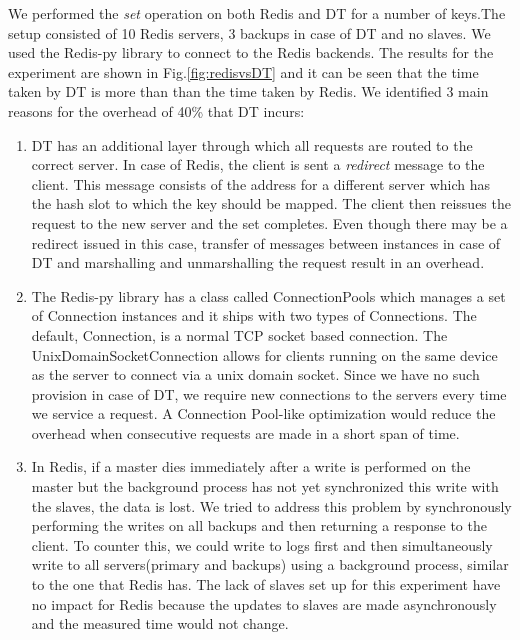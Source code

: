 \documentclass[10pt,twocolumn,letterpaper]{article}
\begin{document}
We performed the \textit{set} operation on both Redis and DT for a number of keys.The setup consisted of 10 Redis servers, 3 backups in case of DT and no slaves. We used the Redis-py library to connect to the Redis backends. The results for the experiment are shown in Fig.\ref{fig:redisvsDT} and it can be seen that the time taken by DT is more than than the time taken by Redis. We identified 3 main reasons for the overhead of 40\% that DT incurs:\\
\begin{enumerate}
 \item DT has an additional layer through which all requests are routed to the correct server. In case of Redis, the client is sent a \textit{redirect} message to the client. This message consists of the address for a different server which has the hash slot to which the key should be mapped. The client then reissues the request to the new server and the set completes. Even though there may be a redirect issued in this case, transfer of messages between instances in case of DT and marshalling and unmarshalling the request result in an overhead.
 \item The Redis-py library has a class called ConnectionPools which manages a set of Connection instances and it ships with two types of Connections. The default, Connection, is a normal TCP socket based connection. The UnixDomainSocketConnection allows for clients running on the same device as the server to connect via a unix domain socket. Since we have no such provision in case of DT, we require new connections to the servers every time we service a request. A Connection Pool-like optimization would reduce the overhead when consecutive requests are made in a short span of time.
 \item In Redis, if a master dies immediately after a write is performed on the master but the background process has not yet synchronized this write with the slaves, the data is lost. We tried to address this problem by synchronously performing the writes on all backups and then returning a response to the client. To counter this, we could write to logs first and then simultaneously write to all servers(primary and backups) using a background process, similar to the one that Redis has. The lack of slaves set up for this experiment have no impact for Redis because the updates to slaves are made asynchronously and the measured time would not change.
\end{enumerate}
\end{document}
